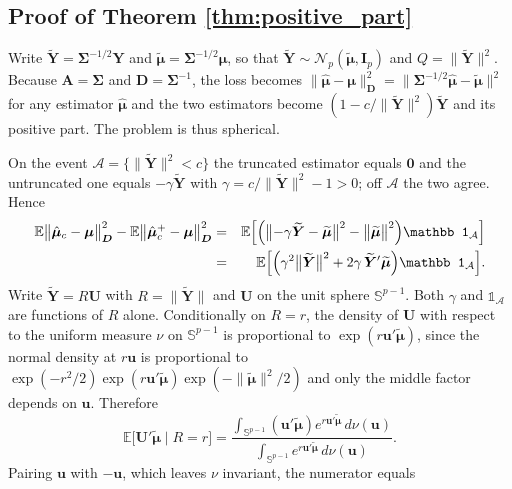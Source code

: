 \documentclass[pdflatex,sn-mathphys-num]{sn-jnl}%
\theoremstyle{thmstyleone}%
\theoremstyle{thmstyletwo}%
\theoremstyle{thmstylethree}%
\newcommand{\E}{\mathbb{E}}
\begin{document}
\begin{appendices}
\subsection*{Proof of Theorem \ref{thm:positive_part}}

Write $\widetilde{\bm Y}=\bm\Sigma^{-1/2}\bm Y$ and $\widetilde{\bm\mu}=\bm\Sigma^{-1/2}\bm\mu$, so that $\widetilde{\bm Y}\sim\mathcal N_p(\widetilde{\bm\mu},\bm I_p)$ and $Q=\|\widetilde{\bm Y}\|^2$. Because $\bm A=\bm\Sigma$ and $\bm D=\bm\Sigma^{-1}$, the loss becomes $\|\hat{\bm\mu}-\bm\mu\|^2_{\bm D}=\|\bm\Sigma^{-1/2}\hat{\bm\mu}-\widetilde{\bm\mu}\|^2$ for any estimator $\hat{\bm\mu}$ and the two estimators become $(1-c/\|\widetilde{\bm Y}\|^2)\widetilde{\bm Y}$ and its positive part. The problem is thus spherical.

On the event $\mathcal A=\{\|\widetilde{\bm Y}\|^2<c\}$ the truncated estimator equals $\bm 0$ and the untruncated one equals $-\gamma\widetilde{\bm Y}$ with $\gamma=c/\|\widetilde{\bm Y}\|^2-1>0$; off $\mathcal A$ the two agree. Hence
\begin{eqnarray}
\label{eq:pf_pp_diff}
\E\bigl\|\hat{\bm\mu}_c-\bm\mu\bigr\|^2_{\bm D}
-\E\bigl\|\hat{\bm\mu}^{+}_c-\bm\mu\bigr\|^2_{\bm D}
&=&
\E\Bigl[\Bigl(\bigl\|-\gamma\widetilde{\bm Y}-\widetilde{\bm\mu}\bigr\|^2-\bigl\|\widetilde{\bm\mu}\bigr\|^2\Bigr)\mathbb 1_{\mathcal A}\Bigr]
\cr
&=&
\E\Bigl[\Bigl(\gamma^{2}\bigl\|\widetilde{\bm Y}\bigr\|^{2}+2\gamma\,\widetilde{\bm Y}'\widetilde{\bm\mu}\Bigr)\mathbb 1_{\mathcal A}\Bigr].
\end{eqnarray}
Write $\widetilde{\bm Y}=R\bm U$ with $R=\|\widetilde{\bm Y}\|$ and $\bm U$ on the unit sphere $\mathbb S^{p-1}$. Both $\gamma$ and $\mathbb 1_{\mathcal A}$ are functions of $R$ alone. Conditionally on $R=r$, the density of $\bm U$ with respect to the uniform measure $\nu$ on $\mathbb S^{p-1}$ is proportional to $\exp(r\bm u'\widetilde{\bm\mu})$, since the normal density at $r\bm u$ is proportional to $\exp(-r^2/2)\exp(r\bm u'\widetilde{\bm\mu})\exp(-\|\widetilde{\bm\mu}\|^2/2)$ and only the middle factor depends on $\bm u$. Therefore
\begin{equation}
\E\bigl[\bm U'\widetilde{\bm\mu}\mid R=r\bigr]
=
\frac{\int_{\mathbb S^{p-1}}(\bm u'\widetilde{\bm\mu})e^{r\bm u'\widetilde{\bm\mu}}\,d\nu(\bm u)}
     {\int_{\mathbb S^{p-1}}e^{r\bm u'\widetilde{\bm\mu}}\,d\nu(\bm u)} .
\end{equation}
Pairing $\bm u$ with $-\bm u$, which leaves $\nu$ invariant, the numerator equals
\begin{equation}

\end{equation}
\end{appendices}
\end{document}
